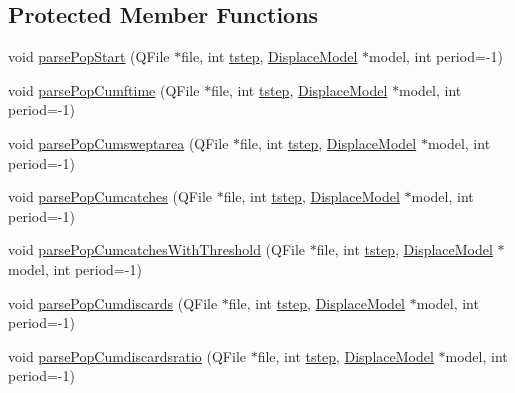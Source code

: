 \subsection*{Protected Member Functions}
\begin{DoxyCompactItemize}
\item 
void \mbox{\hyperlink{class_output_file_parser_a56c77b7e8aa40fb9c5173f4bb7c9253a}{parse\+Pop\+Start}} (Q\+File $\ast$file, int \mbox{\hyperlink{thread__vessels_8cpp_a84bc73d278de929ec9974e1a95d9b23a}{tstep}}, \mbox{\hyperlink{class_displace_model}{Displace\+Model}} $\ast$model, int period=-\/1)
\item 
void \mbox{\hyperlink{class_output_file_parser_ad0612705c50457cd5c6c90718302a251}{parse\+Pop\+Cumftime}} (Q\+File $\ast$file, int \mbox{\hyperlink{thread__vessels_8cpp_a84bc73d278de929ec9974e1a95d9b23a}{tstep}}, \mbox{\hyperlink{class_displace_model}{Displace\+Model}} $\ast$model, int period=-\/1)
\item 
void \mbox{\hyperlink{class_output_file_parser_a9e29e1e8e2850347b7db4c68c16c8166}{parse\+Pop\+Cumsweptarea}} (Q\+File $\ast$file, int \mbox{\hyperlink{thread__vessels_8cpp_a84bc73d278de929ec9974e1a95d9b23a}{tstep}}, \mbox{\hyperlink{class_displace_model}{Displace\+Model}} $\ast$model, int period=-\/1)
\item 
void \mbox{\hyperlink{class_output_file_parser_a6ef610f6c4343c47ffbb7525b0496ef4}{parse\+Pop\+Cumcatches}} (Q\+File $\ast$file, int \mbox{\hyperlink{thread__vessels_8cpp_a84bc73d278de929ec9974e1a95d9b23a}{tstep}}, \mbox{\hyperlink{class_displace_model}{Displace\+Model}} $\ast$model, int period=-\/1)
\item 
void \mbox{\hyperlink{class_output_file_parser_a15d015c798557f5a567ade7149770f27}{parse\+Pop\+Cumcatches\+With\+Threshold}} (Q\+File $\ast$file, int \mbox{\hyperlink{thread__vessels_8cpp_a84bc73d278de929ec9974e1a95d9b23a}{tstep}}, \mbox{\hyperlink{class_displace_model}{Displace\+Model}} $\ast$model, int period=-\/1)
\item 
void \mbox{\hyperlink{class_output_file_parser_a929c77d31aa281506e27e7a3fe8416b1}{parse\+Pop\+Cumdiscards}} (Q\+File $\ast$file, int \mbox{\hyperlink{thread__vessels_8cpp_a84bc73d278de929ec9974e1a95d9b23a}{tstep}}, \mbox{\hyperlink{class_displace_model}{Displace\+Model}} $\ast$model, int period=-\/1)
\item 
void \mbox{\hyperlink{class_output_file_parser_ad5742f433c499362a35600794a9e4e23}{parse\+Pop\+Cumdiscardsratio}} (Q\+File $\ast$file, int \mbox{\hyperlink{thread__vessels_8cpp_a84bc73d278de929ec9974e1a95d9b23a}{tstep}}, \mbox{\hyperlink{class_displace_model}{Displace\+Model}} $\ast$model, int period=-\/1)

\end{DoxyCompactItemize}
